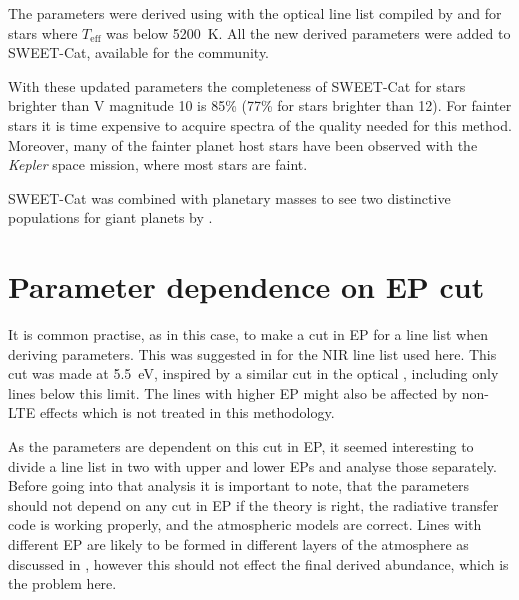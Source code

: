 The parameters were derived using \FASMA with the optical line list compiled by \citet{Sousa2008a}
and \citet{Tsantaki2013} for stars where $T_\mathrm{eff}$ was below \SI{5200}{K}. All the new
derived parameters were added to SWEET-Cat, available for the community.

With these updated parameters the completeness of SWEET-Cat for stars brighter than V magnitude 10
is 85\% (77\% for stars brighter than 12). For fainter stars it is time expensive to acquire spectra
of the quality needed for this method. Moreover, many of the fainter planet host stars have been
observed with the \emph{Kepler} space mission, where most stars are faint.

SWEET-Cat was combined with planetary masses to see two distinctive populations for giant planets by
\citet{Santos2017}.



\section{Parameter dependence on EP cut}
\label{sec:EPcut}

It is common practise, as in this case, to make a cut in EP for a line list when deriving
parameters. This was suggested in \citet{Andreasen2016} \citep[later done in][]{Andreasen2017b} for
the NIR line list used here. This cut was made at \SI{5.5}{eV}, inspired by a similar cut in the
optical \citep{Sousa2008a}, including only lines below this limit. The lines with higher EP might
also be affected by non-LTE effects which is not treated in this methodology.

As the parameters are dependent on this cut in EP, it
seemed interesting to divide a line list in two with upper and lower EPs and analyse those
separately. Before going into that analysis it is important to note, that the parameters should not
depend on any cut in EP if the theory is right, the radiative transfer code is working properly, and
the atmospheric models are correct. Lines with different EP are likely to be formed in different
layers of the atmosphere as discussed in , however this should not
effect the final derived abundance, which is the problem here.
